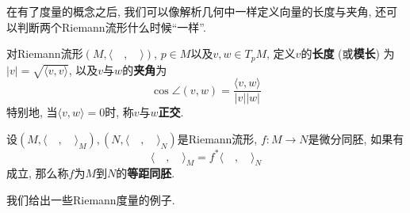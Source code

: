 在有了度量的概念之后, 我们可以像解析几何中一样定义向量的长度与夹角, 还可以判断两个Riemann流形什么时候``一样''.

\begin{defn}
    对Riemann流形$(M,\langle\quad,\quad\rangle)$, $p\in M$以及$v,w\in T_pM$, 定义$v$的\textbf{长度} (或\textbf{模长}) 为$|v|=\sqrt{\langle v,v\rangle}$, 以及$v$与$w$的\textbf{夹角}为
    \[\cos\angle(v,w)=\frac{\langle v,w\rangle}{|v||w|}\]
    特别地, 当$\langle v,w\rangle=0$时, 称$v$与$w$\textbf{正交}.
\end{defn}

\begin{defn}
    设$(M,\langle\quad,\quad\rangle_M),(N,\langle\quad,\quad\rangle_N)$是Riemann流形, $f:M\to N$是微分同胚, 如果有
    \[\langle\quad,\quad\rangle_M=f^*\langle\quad,\quad\rangle_N\]
    成立, 那么称$f$为$M$到$N$的\textbf{等距同胚}.
\end{defn}

我们给出一些Riemann度量的例子.

